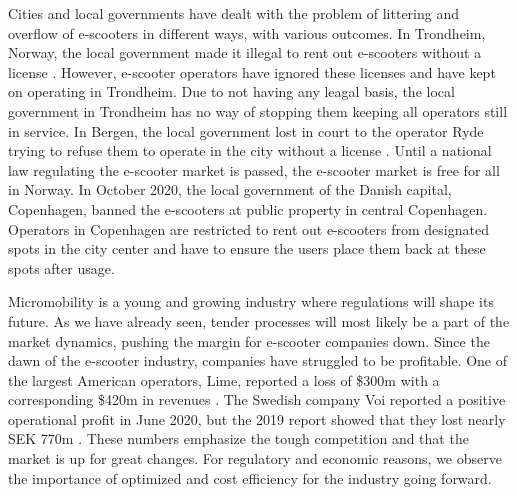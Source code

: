 Cities and local governments have dealt with the problem of littering and overflow of e-scooters in different ways, with various outcomes. In Trondheim, Norway, the local government made it illegal to rent out e-scooters without a license \citep{shifter_trondheim_2020}. However, e-scooter operators have ignored these licenses and have kept on operating in Trondheim. Due to not having any leagal basis, the local government in Trondheim has no way of stopping them keeping all operators still in service. In Bergen, the local government lost in court to the operator Ryde trying to refuse them to operate in the city without a license \citep{ntb_bergen_2020}.  Until a national law regulating the e-scooter market is passed, the e-scooter market is free for all in Norway. In October 2020, the local government of the Danish capital, Copenhagen, banned the e-scooters at public property in central Copenhagen. Operators in Copenhagen are restricted to rent out e-scooters from designated spots in the city center and have to ensure the users place them back at these spots after usage.

Micromobility is a young and growing industry where regulations will shape its future. As we have already seen, tender processes will most likely be a part of the market dynamics, pushing the margin for e-scooter companies down. Since the dawn of the e-scooter industry, companies have struggled to be profitable. One of the largest American operators, Lime, reported a loss of \$300m with a corresponding \$420m in revenues \citep{wilhelm_as_2019}. The Swedish company Voi reported a positive operational profit in June 2020, but the 2019 report showed that they lost nearly SEK 770m \citep{johannessen_voi_2020}. These numbers emphasize the tough competition and that the market is up for great changes. For regulatory and economic reasons, we observe the importance of optimized and cost efficiency for the industry going forward. 
